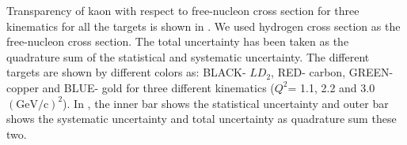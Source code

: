 %
%
%
%

%
\label{Transparency with respect to Hydrogen}
Transparency of kaon with respect to free-nucleon cross section for three kinematics for all the targets is shown in . We used hydrogen cross section as the free-nucleon cross section. The total uncertainty has been taken as the quadrature sum of the statistical and systematic uncertainty. The different targets are shown by different colors as: BLACK- $LD_2$, RED- carbon, GREEN- copper and BLUE- gold for three different kinematics ($Q^2$= 1.1, 2.2 and 3.0 $(\mathrm{GeV/c})^2$). In , the inner bar shows the statistical uncertainty and outer bar shows the systematic uncertainty and total uncertainty as quadrature sum these two.

